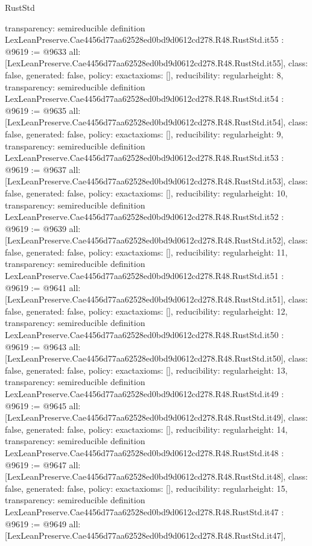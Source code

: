 \begin{lexlean}{RustStd}
\begin{coremodule}
{  transparency: semireducible
}
definition LexLeanPreserve.Cae4456d77aa62528ed0bd9d0612cd278.R48.RustStd.it55 : @9619 := @9633 {
  all: [LexLeanPreserve.Cae4456d77aa62528ed0bd9d0612cd278.R48.RustStd.it55],
  class: false,
  generated: false,
  policy: exact{axioms: []},
  reducibility: regular{height: 8},
  transparency: semireducible
}
definition LexLeanPreserve.Cae4456d77aa62528ed0bd9d0612cd278.R48.RustStd.it54 : @9619 := @9635 {
  all: [LexLeanPreserve.Cae4456d77aa62528ed0bd9d0612cd278.R48.RustStd.it54],
  class: false,
  generated: false,
  policy: exact{axioms: []},
  reducibility: regular{height: 9},
  transparency: semireducible
}
definition LexLeanPreserve.Cae4456d77aa62528ed0bd9d0612cd278.R48.RustStd.it53 : @9619 := @9637 {
  all: [LexLeanPreserve.Cae4456d77aa62528ed0bd9d0612cd278.R48.RustStd.it53],
  class: false,
  generated: false,
  policy: exact{axioms: []},
  reducibility: regular{height: 10},
  transparency: semireducible
}
definition LexLeanPreserve.Cae4456d77aa62528ed0bd9d0612cd278.R48.RustStd.it52 : @9619 := @9639 {
  all: [LexLeanPreserve.Cae4456d77aa62528ed0bd9d0612cd278.R48.RustStd.it52],
  class: false,
  generated: false,
  policy: exact{axioms: []},
  reducibility: regular{height: 11},
  transparency: semireducible
}
definition LexLeanPreserve.Cae4456d77aa62528ed0bd9d0612cd278.R48.RustStd.it51 : @9619 := @9641 {
  all: [LexLeanPreserve.Cae4456d77aa62528ed0bd9d0612cd278.R48.RustStd.it51],
  class: false,
  generated: false,
  policy: exact{axioms: []},
  reducibility: regular{height: 12},
  transparency: semireducible
}
definition LexLeanPreserve.Cae4456d77aa62528ed0bd9d0612cd278.R48.RustStd.it50 : @9619 := @9643 {
  all: [LexLeanPreserve.Cae4456d77aa62528ed0bd9d0612cd278.R48.RustStd.it50],
  class: false,
  generated: false,
  policy: exact{axioms: []},
  reducibility: regular{height: 13},
  transparency: semireducible
}
definition LexLeanPreserve.Cae4456d77aa62528ed0bd9d0612cd278.R48.RustStd.it49 : @9619 := @9645 {
  all: [LexLeanPreserve.Cae4456d77aa62528ed0bd9d0612cd278.R48.RustStd.it49],
  class: false,
  generated: false,
  policy: exact{axioms: []},
  reducibility: regular{height: 14},
  transparency: semireducible
}
definition LexLeanPreserve.Cae4456d77aa62528ed0bd9d0612cd278.R48.RustStd.it48 : @9619 := @9647 {
  all: [LexLeanPreserve.Cae4456d77aa62528ed0bd9d0612cd278.R48.RustStd.it48],
  class: false,
  generated: false,
  policy: exact{axioms: []},
  reducibility: regular{height: 15},
  transparency: semireducible
}
definition LexLeanPreserve.Cae4456d77aa62528ed0bd9d0612cd278.R48.RustStd.it47 : @9619 := @9649 {
  all: [LexLeanPreserve.Cae4456d77aa62528ed0bd9d0612cd278.R48.RustStd.it47],
}
\end{coremodule}
\end{lexlean}
